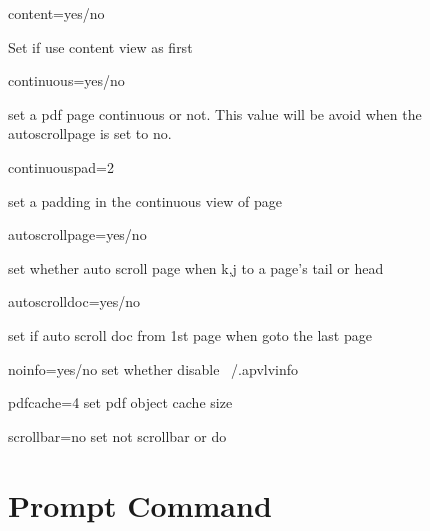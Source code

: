 \documentclass[a4paper,12pt]{article}
\begin{document}
\begin{description}
\item content=yes/no

Set if use content view as first

\item continuous=yes/no

set a pdf page continuous or not. This value will be avoid when the autoscrollpage is set to no.

\item continuouspad=2

set a padding in the continuous view of page

\item autoscrollpage=yes/no

set whether auto scroll page when k,j to a page's tail or head

\item autoscrolldoc=yes/no

set if auto scroll doc from 1st page when goto the last page

\item noinfo=yes/no
set whether disable ~/.apvlvinfo

\item pdfcache=4
set pdf object cache size

\item scrollbar=no
set not scrollbar or do

\end{description}

\newpage

\section{Prompt Command}
\end{document}
